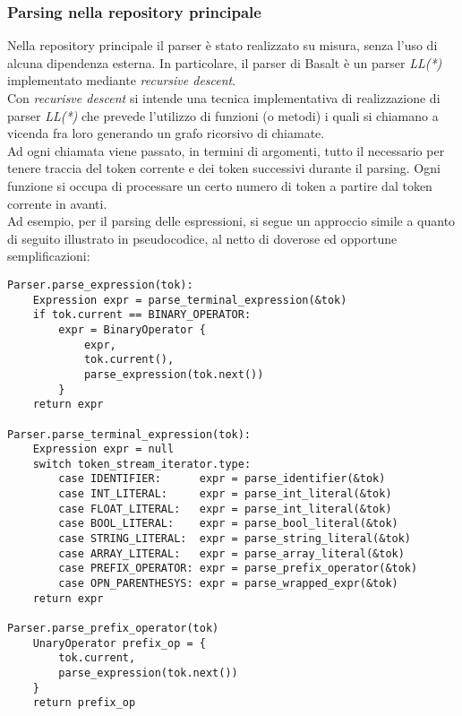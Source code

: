 \subsubsection{Parsing nella repository principale}
Nella repository principale il parser è
stato realizzato su misura, senza l'uso di alcuna
dipendenza esterna. In particolare, il parser di Basalt è un 
parser \textit{LL(*)} implementato 
mediante \textit{recursive descent}. \\

Con \textit{recurisve descent} si intende una tecnica implementativa 
di realizzazione di parser \textit{LL(*)} che prevede l'utilizzo di 
funzioni (o metodi) i quali si chiamano a vicenda fra loro generando 
un grafo ricorsivo di chiamate. \\

Ad ogni chiamata viene passato, in termini di argomenti, tutto il necessario 
per tenere traccia del token corrente e dei token successivi durante il 
parsing. Ogni funzione si occupa di processare un certo numero di 
token a partire dal token corrente in avanti. \\

Ad esempio, per il parsing delle espressioni, si segue un approccio 
simile a quanto di seguito illustrato in pseudocodice, al netto di 
doverose ed opportune semplificazioni:


\vspace{0.5cm}
\begin{lstlisting}[frame=single]
Parser.parse_expression(tok):
    Expression expr = parse_terminal_expression(&tok)
    if tok.current == BINARY_OPERATOR:
        expr = BinaryOperator {
            expr,
            tok.current(),
            parse_expression(tok.next())
        }
    return expr

Parser.parse_terminal_expression(tok):
    Expression expr = null
    switch token_stream_iterator.type:
        case IDENTIFIER:      expr = parse_identifier(&tok)
        case INT_LITERAL:     expr = parse_int_literal(&tok)
        case FLOAT_LITERAL:   expr = parse_int_literal(&tok)
        case BOOL_LITERAL:    expr = parse_bool_literal(&tok)
        case STRING_LITERAL:  expr = parse_string_literal(&tok)
        case ARRAY_LITERAL:   expr = parse_array_literal(&tok)
        case PREFIX_OPERATOR: expr = parse_prefix_operator(&tok)
        case OPN_PARENTHESYS: expr = parse_wrapped_expr(&tok)
    return expr

Parser.parse_prefix_operator(tok)
    UnaryOperator prefix_op = { 
        tok.current, 
        parse_expression(tok.next()) 
    }
    return prefix_op

\end{lstlisting}
\vspace{0.5cm}